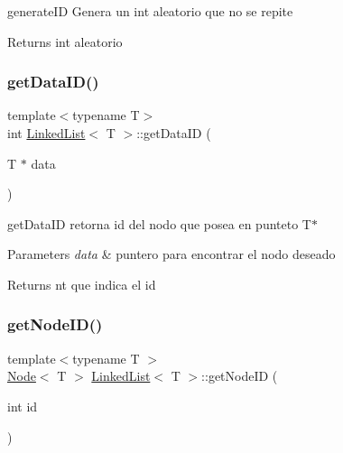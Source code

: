generate\+ID Genera un int aleatorio que no se repite 

\begin{DoxyReturn}{Returns}
int aleatorio 
\end{DoxyReturn}
\mbox{\label{class_linked_list_a4e8d22209f9025284799c0212227e8a2}} 
\subsubsection{\texorpdfstring{get\+Data\+I\+D()}{getDataID()}}
{\footnotesize\ttfamily template$<$typename T$>$ \\
int \hyperlink{class_linked_list}{Linked\+List}$<$ T $>$\+::get\+Data\+ID (\begin{DoxyParamCaption}\item[{T $\ast$}]{data }\end{DoxyParamCaption})}



get\+Data\+ID retorna id del nodo que posea en punteto T$\ast$ 


\begin{DoxyParams}{Parameters}
{\em data} & puntero para encontrar el nodo deseado \\
\hline
\end{DoxyParams}
\begin{DoxyReturn}{Returns}
nt que indica el id 
\end{DoxyReturn}
\mbox{\label{class_linked_list_aaf96dde647086d4370cd0b75024c1603}} 
\subsubsection{\texorpdfstring{get\+Node\+I\+D()}{getNodeID()}}
{\footnotesize\ttfamily template$<$typename T $>$ \\
\hyperlink{class_node}{Node}$<$ T $>$ \hyperlink{class_linked_list}{Linked\+List}$<$ T $>$\+::get\+Node\+ID (\begin{DoxyParamCaption}\item[{int}]{id }\end{DoxyParamCaption})}



